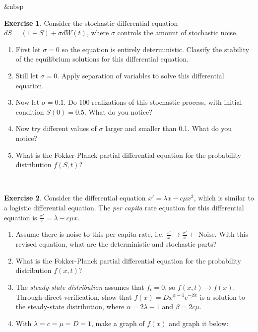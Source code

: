 \documentclass[
]{book}
\theoremstyle{definition}
\theoremstyle{definition}
\theoremstyle{definition}
\newtheorem{exercise}{Exercise}[chapter]
\theoremstyle{remark}
\begin{document}
\&nbsp
\begin{exercise}
\protect\hypertarget{exr:unnamed-chunk-362}{}{\label{exr:unnamed-chunk-362} }Consider the stochastic differential equation \(\displaystyle dS = \left( 1 - S \right) + \sigma dW(t)\), where \(\sigma\) controls the amount of stochastic noise.

\begin{enumerate}[label=\alph*.]
\item First let $\sigma = 0$ so the equation is entirely deterministic.  Classify the stability of the equilibrium solutions for this differential equation.
\item Still let $\sigma = 0$.  Apply separation of variables to solve this differential equation.
\item Now let $\sigma = 0.1$.  Do 100 realizations of this stochastic process, with initial condition $S(0)=0.5$.  What do you notice?
  \item Now try different values of $\sigma$ larger and smaller than 0.1.  What do you notice?
\item What is the Fokker-Planck partial differential equation for the probability distribution $f(S,t)$?
\end{enumerate}
\end{exercise}

~

\begin{exercise}
\protect\hypertarget{exr:unnamed-chunk-363}{}{\label{exr:unnamed-chunk-363} }Consider the differential equation \(\displaystyle x' = \lambda x - c \mu x^{2}\), which is similar to a logistic differential equation. The \emph{per capita} rate equation for this differential equation is \(\displaystyle \frac{x'}{x} = \lambda - c \mu x\).

\begin{enumerate}[label=\alph*.]
\item Assume there is noise to this per capita rate, i.e. $\displaystyle \frac{x'}{x} \rightarrow \displaystyle \frac{x'}{x} + \mbox{ Noise}$.  With this revised equation, what are the deterministic and stochastic parts?
\item What is the Fokker-Planck partial differential equation for the probability distribution $f(x,t)$?
\item The \emph{steady-state distribution} assumes that $f_{t} = 0$, so $f(x,t) \rightarrow f(x)$.  Through direct verification, show that $f(x)=Dx^{\alpha-1} e^{-\beta x}$ is a solution to the steady-state distribution, where $\alpha = 2 \lambda - 1$ and $\beta = 2c\mu$.
\item With $\lambda = c = \mu = D = 1$, make a graph of $f(x)$ and graph it below:
\end{enumerate}
\end{exercise}
\end{document}
